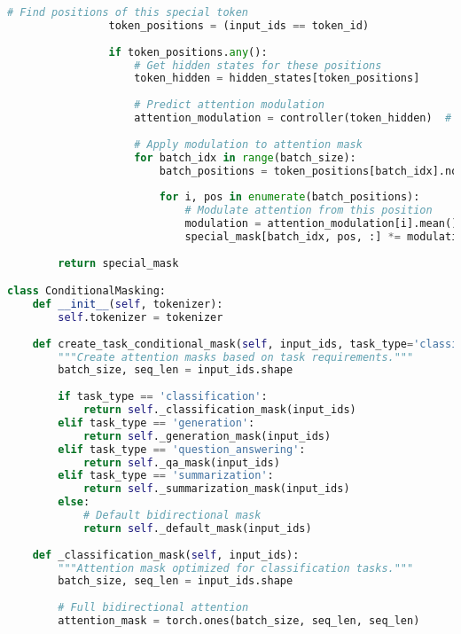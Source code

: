 \begin{lstlisting}[language=Python, caption=Dynamic attention masking based on content]
                # Find positions of this special token
                token_positions = (input_ids == token_id)
                
                if token_positions.any():
                    # Get hidden states for these positions
                    token_hidden = hidden_states[token_positions]
                    
                    # Predict attention modulation
                    attention_modulation = controller(token_hidden)  # [num_tokens, num_heads]
                    
                    # Apply modulation to attention mask
                    for batch_idx in range(batch_size):
                        batch_positions = token_positions[batch_idx].nonzero(as_tuple=True)[0]
                        
                        for i, pos in enumerate(batch_positions):
                            # Modulate attention from this position
                            modulation = attention_modulation[i].mean()  # Average over heads
                            special_mask[batch_idx, pos, :] *= modulation
                            
        return special_mask

class ConditionalMasking:
    def __init__(self, tokenizer):
        self.tokenizer = tokenizer
        
    def create_task_conditional_mask(self, input_ids, task_type='classification'):
        """Create attention masks based on task requirements."""
        batch_size, seq_len = input_ids.shape
        
        if task_type == 'classification':
            return self._classification_mask(input_ids)
        elif task_type == 'generation':
            return self._generation_mask(input_ids)
        elif task_type == 'question_answering':
            return self._qa_mask(input_ids)
        elif task_type == 'summarization':
            return self._summarization_mask(input_ids)
        else:
            # Default bidirectional mask
            return self._default_mask(input_ids)
            
    def _classification_mask(self, input_ids):
        """Attention mask optimized for classification tasks."""
        batch_size, seq_len = input_ids.shape
        
        # Full bidirectional attention
        attention_mask = torch.ones(batch_size, seq_len, seq_len)
        

\end{lstlisting}
